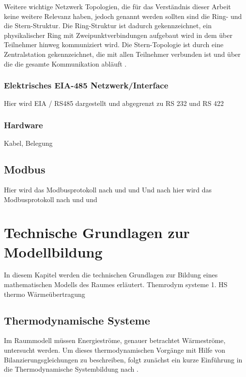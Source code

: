 Weitere wichtige Netzwerk Topologien, die für das Verständnis dieser Arbeit keine weitere Relevanz haben, jedoch genannt werden sollten sind die Ring- und die Stern-Struktur. Die Ring-Struktur ist dadurch gekennzeichnet, ein physikalischer Ring mit Zweipunktverbindungen aufgebaut wird in dem über Teilnehmer hinweg kommuniziert wird. Die Stern-Topologie ist durch eine Zentralstation gekennzeichnet, die mit allen Teilnehmer verbunden ist und über die die gesamte Kommunikation abläuft \cite[S.~6f.]{schn06}.

\subsubsection{Elektrisches EIA-485 Netzwerk/Interface}
Hier wird EIA / RS485 dargestellt und abgegrenzt zu RS 232 und RS 422

\subsubsection{Hardware}
Kabel, Belegung

\subsection{Modbus}
Hier wird das Modbusprotokoll nach \cite{mod12} und \cite{mod06ser} und \cite{mod06tcp}  
Und nach hier wird das Modbusprotokoll nach \cite[S.5]{mod12} und \cite[S.5]{mod06ser} und \cite[S.5]{mod06tcp}









\section{Technische Grundlagen zur Modellbildung}
\label{sec:grundlagenmodell}
In diesem Kapitel werden die technischen Grundlagen zur Bildung eines mathematischen Modells des Raumes erläutert.
Themrodym systeme
1. HS thermo
Wärmeübertragung

\subsection{Thermodynamische Systeme}
Im Raummodell müssen Energieströme, genauer betrachtet Wärmeströme, untersucht werden. Um dieses thermodynamischen Vorgänge mit Hilfe von Bilanzierungsgleichungen zu beschreiben, folgt zunächst ein kurze Einführung in die Thermodynamische Systembildung nach \cite[S.~11ff.]{ba12}.


